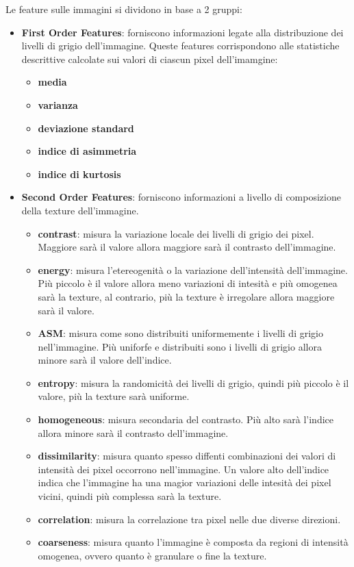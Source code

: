 Le feature sulle immagini si dividono in base a 2 gruppi\cite{explanation-features}:
\begin{itemize}
    \item \textbf{First Order Features}: forniscono informazioni legate alla
    distribuzione dei livelli di grigio dell'immagine. Queste features corrispondono
    alle statistiche descrittive calcolate sui valori di ciascun pixel dell'imamgine:
    \begin{itemize}
        \item \textbf{media}
        \item \textbf{varianza}
        \item \textbf{deviazione standard}
        \item \textbf{indice di asimmetria}
        \item \textbf{indice di kurtosis}
    \end{itemize}
    \item \textbf{Second Order Features}: forniscono informazioni a livello di 
    composizione della texture dell'immagine. 
    \begin{itemize}
        \item \textbf{contrast}: misura la variazione locale dei livelli di grigio 
        dei pixel. Maggiore sarà il valore allora maggiore sarà il contrasto dell'immagine.
        \item \textbf{energy}: misura l'etereogenità o la variazione dell'intensità
        dell'immagine. Più piccolo è il valore allora meno variazioni di intesità e
        più omogenea sarà la texture, al contrario, più la texture è irregolare 
        allora maggiore sarà il valore.
        \item \textbf{ASM}: misura come sono distribuiti uniformemente i livelli
        di grigio nell'immagine. Più uniforfe e distribuiti sono i livelli di grigio
        allora minore sarà il valore dell'indice.
        \item \textbf{entropy}: misura la randomicità dei livelli di grigio, quindi
        più piccolo è il valore, più la texture sarà uniforme.
        \item \textbf{homogeneous}: misura secondaria del contrasto. Più alto sarà
        l'indice allora minore sarà il contrasto dell'immagine.
        \item \textbf{dissimilarity}: misura quanto spesso diffenti combinazioni dei valori
        di intensità dei pixel occorrono nell'immagine. Un valore alto dell'indice 
        indica che l'immagine ha una magior variazioni delle intesità dei pixel vicini,
        quindi più complessa sarà la texture.
        \item \textbf{correlation}: misura la correlazione tra pixel nelle due diverse
        direzioni.
        \item \textbf{coarseness}: misura quanto l'immagine è composta da regioni 
        di intensità omogenea, ovvero quanto è granulare o fine la texture.
    \end{itemize}
\end{itemize}

